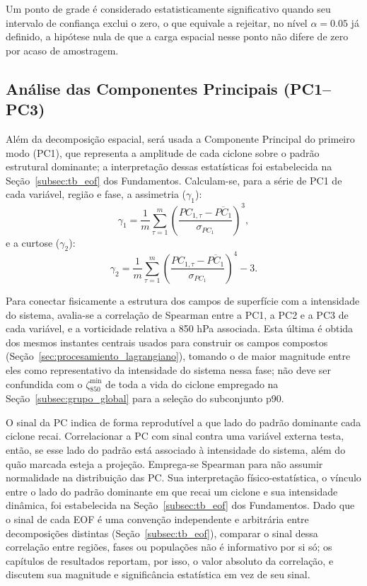 Um ponto de grade é considerado estatisticamente significativo quando seu intervalo de confiança exclui o zero, o que equivale a rejeitar, no nível $\alpha = 0.05$ já definido, a hipótese nula de que a carga espacial nesse ponto não difere de zero por acaso de amostragem.

\subsection{Análise das Componentes Principais (PC1--PC3)}\label{subsec:analisis_pc}

Além da decomposição espacial, será usada a Componente Principal do primeiro modo (PC1), que representa a amplitude de cada ciclone sobre o padrão estrutural dominante; a interpretação dessas estatísticas foi estabelecida na Seção~\ref{subsec:tb_eof} dos Fundamentos.
Calculam-se, para a série de PC1 de cada variável, região e fase, a assimetria ($\gamma_1$):
\begin{equation}\label{eq:pc1_asimetria}
    \gamma_1 = \frac{1}{m} \sum_{\tau=1}^{m} \left(\frac{PC_{1,\tau} - \overline{PC_1}}{\sigma_{PC_1}}\right)^3,
\end{equation}
e a curtose ($\gamma_2$):
\begin{equation}\label{eq:pc1_curtosis}
    \gamma_2 = \frac{1}{m} \sum_{\tau=1}^{m} \left(\frac{PC_{1,\tau} - \overline{PC_1}}{\sigma_{PC_1}}\right)^4 - 3.
\end{equation}

Para conectar fisicamente a estrutura dos campos de superfície com a intensidade do sistema, avalia-se a correlação de Spearman entre a PC1, a PC2 e a PC3 de cada variável, e a vorticidade relativa a 850 hPa associada.
Esta última é obtida dos mesmos instantes centrais usados para construir os campos compostos (Seção~\ref{sec:procesamiento_lagrangiano}), tomando o de maior magnitude entre eles como representativo da intensidade do sistema nessa fase; não deve ser confundida com o $\zeta_{850}^{\min}$ de toda a vida do ciclone empregado na Seção~\ref{subsec:grupo_global} para a seleção do subconjunto p90.

O sinal da PC indica de forma reprodutível a que lado do padrão dominante cada ciclone recai.
Correlacionar a PC com sinal contra uma variável externa testa, então, se esse lado do padrão está associado à intensidade do sistema, além do quão marcada esteja a projeção.
Emprega-se Spearman para não assumir normalidade na distribuição das PC.
Sua interpretação físico-estatística, o vínculo entre o lado do padrão dominante em que recai um ciclone e sua intensidade dinâmica, foi estabelecida na Seção~\ref{subsec:tb_eof} dos Fundamentos.
Dado que o sinal de cada EOF é uma convenção independente e arbitrária entre decomposições distintas (Seção~\ref{subsec:tb_eof}), comparar o sinal dessa correlação entre regiões, fases ou populações não é informativo por si só; os capítulos de resultados reportam, por isso, o valor absoluto da correlação, e discutem sua magnitude e significância estatística em vez de seu sinal.


